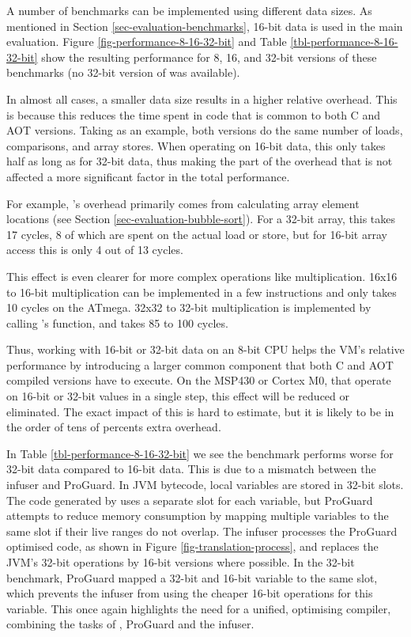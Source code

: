 A number of benchmarks can be implemented using different data sizes. As mentioned in Section \ref{sec-evaluation-benchmarks}, 16-bit data is used in the main evaluation. Figure \ref{fig-performance-8-16-32-bit} and Table \ref{tbl-performance-8-16-32-bit} show the resulting performance for 8, 16, and 32-bit versions of these benchmarks (no 32-bit version of  was available).

In almost all cases, a smaller data size results in a higher relative overhead. This is because this reduces the time spent in code that is common to both C and AOT versions. Taking  as an example, both versions do the same number of loads, comparisons, and array stores. When operating on 16-bit data, this only takes half as long as for 32-bit data, thus making the part of the overhead that is not affected a more significant factor in the total performance.

For example, 's overhead primarily comes from calculating array element locations (see Section \ref{sec-evaluation-bubble-sort}). For a 32-bit array, this takes 17 cycles, 8 of which are spent on the actual load or store, but for 16-bit array access this is only 4 out of 13 cycles.

This effect is even clearer for more complex operations like multiplication. 16x16 to 16-bit multiplication can be implemented in a few instructions and only takes 10 cycles on the ATmega. 32x32 to 32-bit multiplication is implemented by calling 's  function, and takes 85 to 100 cycles.

Thus, working with 16-bit or 32-bit data on an 8-bit CPU helps the VM's relative performance by introducing a larger common component that both C and AOT compiled versions have to execute. On the MSP430 or Cortex M0, that operate on 16-bit or 32-bit values in a single step, this effect will be reduced or eliminated. The exact impact of this is hard to estimate, but it is likely to be in the order of tens of percents extra overhead.

In Table \ref{tbl-performance-8-16-32-bit} we see the  benchmark performs worse for 32-bit data compared to 16-bit data. This is due to a mismatch between the infuser and ProGuard. In JVM bytecode, local variables are stored in 32-bit slots. The code generated by  uses a separate slot for each variable, but ProGuard attempts to reduce memory consumption by mapping multiple variables to the same slot if their live ranges do not overlap. The infuser processes the ProGuard optimised code, as shown in Figure \ref{fig-translation-process}, and replaces the JVM's 32-bit operations by 16-bit versions where possible. In the 32-bit  benchmark, ProGuard mapped a 32-bit and 16-bit variable to the same slot, which prevents the infuser from using the cheaper 16-bit operations for this variable. This once again highlights the need for a unified, optimising compiler, combining the tasks of , ProGuard and the infuser.

